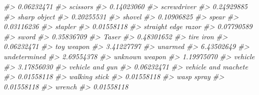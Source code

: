 \documentclass[
  12pt,
  openany]{book}
\newenvironment{Shaded}{\begin{snugshade}}{\end{snugshade}}
\newcommand{\CommentTok}[1]{\textcolor[rgb]{0.37,0.37,0.37}{\textit{#1}}}
\begin{document}
\begin{Shaded}
\begin{Highlighting}[]
\CommentTok{\#\textgreater{}                       0.06232471 }
\CommentTok{\#\textgreater{}                         scissors }
\CommentTok{\#\textgreater{}                       0.14023060 }
\CommentTok{\#\textgreater{}                      screwdriver }
\CommentTok{\#\textgreater{}                       0.24929885 }
\CommentTok{\#\textgreater{}                     sharp object }
\CommentTok{\#\textgreater{}                       0.20255531 }
\CommentTok{\#\textgreater{}                           shovel }
\CommentTok{\#\textgreater{}                       0.10906825 }
\CommentTok{\#\textgreater{}                            spear }
\CommentTok{\#\textgreater{}                       0.03116236 }
\CommentTok{\#\textgreater{}                          stapler }
\CommentTok{\#\textgreater{}                       0.01558118 }
\CommentTok{\#\textgreater{}              straight edge razor }
\CommentTok{\#\textgreater{}                       0.07790589 }
\CommentTok{\#\textgreater{}                            sword }
\CommentTok{\#\textgreater{}                       0.35836709 }
\CommentTok{\#\textgreater{}                            Taser }
\CommentTok{\#\textgreater{}                       0.48301652 }
\CommentTok{\#\textgreater{}                        tire iron }
\CommentTok{\#\textgreater{}                       0.06232471 }
\CommentTok{\#\textgreater{}                       toy weapon }
\CommentTok{\#\textgreater{}                       3.41227797 }
\CommentTok{\#\textgreater{}                          unarmed }
\CommentTok{\#\textgreater{}                       6.43502649 }
\CommentTok{\#\textgreater{}                     undetermined }
\CommentTok{\#\textgreater{}                       2.69554378 }
\CommentTok{\#\textgreater{}                   unknown weapon }
\CommentTok{\#\textgreater{}                       1.19975070 }
\CommentTok{\#\textgreater{}                          vehicle }
\CommentTok{\#\textgreater{}                       3.17856030 }
\CommentTok{\#\textgreater{}                  vehicle and gun }
\CommentTok{\#\textgreater{}                       0.06232471 }
\CommentTok{\#\textgreater{}              vehicle and machete }
\CommentTok{\#\textgreater{}                       0.01558118 }
\CommentTok{\#\textgreater{}                    walking stick }
\CommentTok{\#\textgreater{}                       0.01558118 }
\CommentTok{\#\textgreater{}                       wasp spray }
\CommentTok{\#\textgreater{}                       0.01558118 }
\CommentTok{\#\textgreater{}                           wrench }
\CommentTok{\#\textgreater{}                       0.01558118}
\end{Highlighting}
\end{Shaded}
\end{document}
